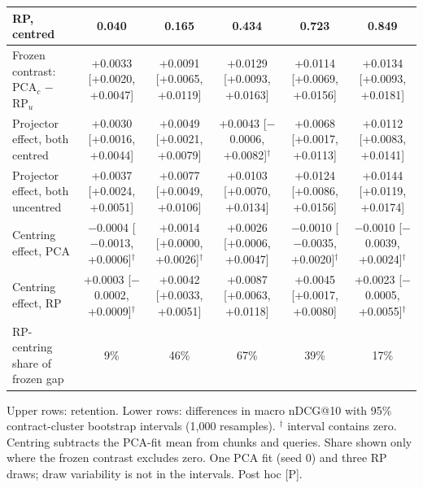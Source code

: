 \begin{table}[t]
\begin{tabular}{lccccc}
RP, centred & 0.040 & 0.165 & 0.434 & 0.723 & 0.849 \\
\midrule
Frozen contrast: PCA$_c$ $-$ RP$_u$ & +0.0033 [+0.0020, +0.0047] & +0.0091 [+0.0065, +0.0119] & +0.0129 [+0.0093, +0.0163] & +0.0114 [+0.0069, +0.0156] & +0.0134 [+0.0093, +0.0181] \\
Projector effect, both centred & +0.0030 [+0.0016, +0.0044] & +0.0049 [+0.0021, +0.0079] & +0.0043 [$-$0.0006, +0.0082]$^\dagger$ & +0.0068 [+0.0017, +0.0113] & +0.0112 [+0.0083, +0.0141] \\
Projector effect, both uncentred & +0.0037 [+0.0024, +0.0051] & +0.0077 [+0.0049, +0.0106] & +0.0103 [+0.0070, +0.0134] & +0.0124 [+0.0086, +0.0156] & +0.0144 [+0.0119, +0.0174] \\
Centring effect, PCA & $-$0.0004 [$-$0.0013, +0.0006]$^\dagger$ & +0.0014 [+0.0000, +0.0026]$^\dagger$ & +0.0026 [+0.0006, +0.0047] & $-$0.0010 [$-$0.0035, +0.0020]$^\dagger$ & $-$0.0010 [$-$0.0039, +0.0024]$^\dagger$ \\
Centring effect, RP & +0.0003 [$-$0.0002, +0.0009]$^\dagger$ & +0.0042 [+0.0033, +0.0051] & +0.0087 [+0.0063, +0.0118] & +0.0045 [+0.0017, +0.0080] & +0.0023 [$-$0.0005, +0.0055]$^\dagger$ \\
RP-centring share of frozen gap & 9\% & 46\% & 67\% & 39\% & 17\% \\
\bottomrule
\end{tabular}
\par\smallskip\footnotesize Upper rows: retention. Lower rows: differences in macro nDCG@10 with 95\% contract-cluster bootstrap intervals (1,000 resamples). $^\dagger$ interval contains zero. Centring subtracts the PCA-fit mean from chunks and queries. Share shown only where the frozen contrast excludes zero. One PCA fit (seed 0) and three RP draws; draw variability is not in the intervals. Post hoc [P].
\end{table}